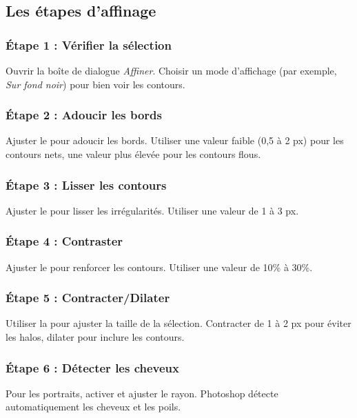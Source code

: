 \subsection{Les étapes d'affinage}

\subsubsection{Étape 1 : Vérifier la sélection}

Ouvrir la boîte de dialogue \emph{Affiner}. Choisir un mode d'affichage (par exemple, \emph{Sur fond noir}) pour bien voir les contours.

\subsubsection{Étape 2 : Adoucir les bords}

Ajuster le  pour adoucir les bords. Utiliser une valeur faible (0,5 à 2 px) pour les contours nets, une valeur plus élevée pour les contours flous.

\subsubsection{Étape 3 : Lisser les contours}

Ajuster le  pour lisser les irrégularités. Utiliser une valeur de 1 à 3 px.

\subsubsection{Étape 4 : Contraster}

Ajuster le  pour renforcer les contours. Utiliser une valeur de 10\% à 30\%.

\subsubsection{Étape 5 : Contracter/Dilater}

Utiliser la  pour ajuster la taille de la sélection. Contracter de 1 à 2 px pour éviter les halos, dilater pour inclure les contours.

\subsubsection{Étape 6 : Détecter les cheveux}

Pour les portraits, activer  et ajuster le rayon. Photoshop détecte automatiquement les cheveux et les poils.

